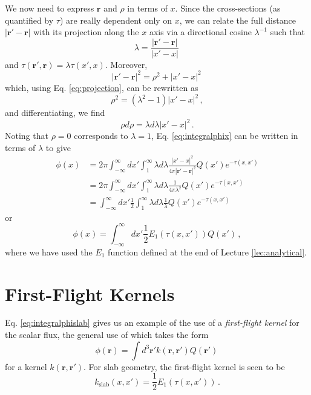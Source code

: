 We now need to express $\mathbf{r}$ and $\rho$ in terms of $x$.  Since the cross-sections (as quantified by $\tau$) are really dependent only on $x$, we can relate the full distance $|\mathbf{r}' - \mathbf{r}|$ with its projection along the $x$ axis via a directional cosine $\lambda^{-1}$ such that
\begin{equation}
 \lambda = \frac{|\mathbf{r}' - \mathbf{r}|}{|x'-x|} \, 
 \label{eq:projection}
\end{equation}
and $\tau(\mathbf{r}',\mathbf{r}) = \lambda \tau(x',x)$.  Moreover,
\begin{equation}
 |\mathbf{r}' - \mathbf{r}|^2 = \rho^2 + |x' - x|^2 \, 
\end{equation}
which, using Eq. \ref{eq:projection}, can be rewritten as
\begin{equation}
 \rho^2 = (\lambda^2 -1 )|x'-x|^2 \, ,
\end{equation}
and differentiating, we find
\begin{equation}
 \rho d\rho = \lambda d\lambda |x'-x|^2 \, .
\end{equation}
Noting that $\rho = 0$ corresponds to $\lambda = 1$, Eq. \ref{eq:integralphix} can be written in terms of $\lambda$ to give
\begin{equation}
\begin{split}
 \phi(x) &= 2\pi \int^{\infty}_{-\infty}dx' \int^{\infty}_1 \lambda d\lambda \frac{|x'-x|^2 }{4\pi|\mathbf{r}' - \mathbf{r}|^2}    Q(x')e^{-\tau(x,x')} \\
        &= 2\pi \int^{\infty}_{-\infty}dx' \int^{\infty}_1 \lambda d\lambda \frac{1}{4\pi \lambda^2}    Q(x')e^{-\tau(x,x')} \\       
        &=  \int^{\infty}_{-\infty} dx'\frac{1}{2} \int^{\infty}_1 \lambda d\lambda\frac{1}{\lambda}  Q(x')e^{-\tau(x,x')} \, 
\end{split}
\end{equation}
or
\begin{equation}
 \phi(x) =  \int^{\infty}_{-\infty} dx'\frac{1}{2} E_1(\tau(x,x'))Q(x') \, ,   
 \label{eq:integralphislab}     
\end{equation}
where we have used the $E_1$ function defined at the end of Lecture \ref{lec:analytical}.  

\section*{First-Flight Kernels}

Eq. \ref{eq:integralphislab} gives us an example of the use of a \textit{first-flight kernel} for the scalar flux, the general use of which takes the form
\begin{equation}
 \phi(\mathbf{r}) = \int d^3\mathbf{r}' k(\mathbf{r},\mathbf{r}')Q(\mathbf{r}') \, 
\end{equation}
for a kernel $k(\mathbf{r},\mathbf{r'})$.  For slab geometry, the first-flight kernel is seen to be
\begin{equation}
 k_{\text{slab}}(x,x') = \frac{1}{2} E_1(\tau(x,x')) \, .
 \label{eq:firstflightkernelslab}
\end{equation}

